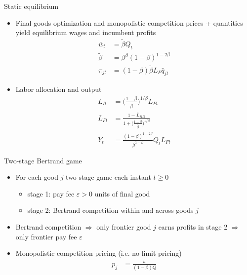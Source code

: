 \documentclass[english,usenames,dvipsnames]{beamer}
\begin{document}
\begin{frame}{Static equilibrium}\label{static_eq_conditions}
	\hyperlink{characterizing_BGP}{}
	\begin{itemize}
		\small 
		\item Final goods optimization and monopolistic competition prices + quantities yield equilibrium wages and incumbent profits 
		\begin{align*}
			\bar{w}_t &= \tilde{\beta} Q_t \\ 
			\tilde{\beta} &= \beta^{\beta} (1-\beta)^{1-2\beta}  \\
			\pi_{jt} &= (1-\beta) \tilde{\beta} L_F \bar{q}_{jt}
		\end{align*}
		\small
		\item Labor allocation and output
		\begin{align*}
			L_{It} &= \Big( \frac{1-\beta}{\tilde{\beta}} \Big)^{1 / \beta} L_{Ft} \\
			L_{Ft} &= \frac{1 - \bar{L}_{RD}}{1 + \Big(\frac{1-\beta}{\tilde{\beta}}\Big)^{1/\beta}} \\
			Y_t &= \frac{(1-\beta)^{1-2\beta}}{\beta^{1-\beta}} Q_t L_{Ft} 
		\end{align*}
	\end{itemize}
\end{frame}

\begin{frame}{Two-stage Bertrand game}\label{two_stage_bertrand2}
	\hyperlink{characterizing_BGP}{}
	\begin{itemize}
		\item For each good $j$ two-stage game each instant $t \ge 0$
		\begin{itemize}
			\item stage 1: pay fee $\varepsilon > 0$ units of final good
			\item stage 2: Bertrand competition within and across goods $j$
		\end{itemize}
		\item Bertrand competition $\Rightarrow$ only frontier good $j$ earns profits in stage 2 $\Rightarrow$ only frontier pay fee $\varepsilon$
		\item Monopolistic competition pricing (i.e. no limit pricing)
		\begin{align*}
		p_j &= \frac{\overline{w}}{(1-\beta) Q} \\
		\end{align*}
	\end{itemize}
\end{frame}
\end{document}
